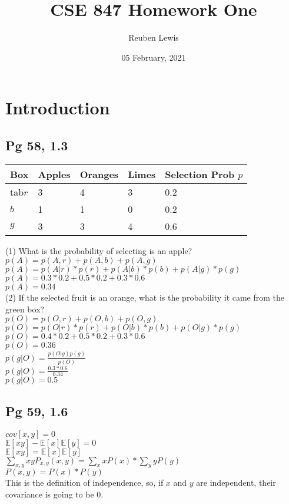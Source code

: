 \documentclass{article}
\title{CSE 847 Homework One}
\author{Reuben Lewis}
\date{05 February, 2021}
\begin{document}
    \maketitle
    \section{Introduction}
    \subsection{Pg 58, 1.3}
        \begin{tabular}{ l | l | l | l | l}
            Box & Apples & Oranges & Limes & Selection Prob $p$ \\
            \hline
            tab$r$ & 3 & 4 & 3 & 0.2\\
            $b$ & 1 & 1 & 0 & 0.2\\
            $g$ & 3 & 3 & 4 & 0.6\\
        \end{tabular}

        (1) What is the probability of selecting is an apple?
            $p(A) = p(A,r) + p(A,b) + p(A,g)$ \\
            $p(A) = p(A|r)*p(r) + p(A|b)*p(b) + p(A|g)*p(g)$ \\
            $p(A) = 0.3*0.2 + 0.5*0.2 + 0.3*0.6$ \\
            $p(A) = 0.34$ \\

        (2) If the selected fruit is an orange, what is the probability 
            it came from the green box? \\
            $p(O) = p(O,r) + p(O,b) + p(O,g)$ \\
            $p(O) = p(O|r)*p(r) + p(O|b)*p(b) + p(O|g)*p(g)$ \\
            $p(O) = 0.4*0.2 + 0.5*0.2 + 0.3*0.6$ \\
            $p(O) = 0.36$ \\
            $p(g|O) = \frac{p(O|g)p(g)}{p(O)}$ \\
            $p(g|O) = \frac{0.3 * 0.6}{0.34}$ \\
            $p(g|O) = 0.5$ 

    \subsection{Pg 59, 1.6}
    $cov[x,y] = 0$\\
    $\mathbb{E} [xy] - \mathbb{E}[x] \mathbb{E}[y] = 0$\\
    $\mathbb{E} [xy] = \mathbb{E}[x] \mathbb{E}[y]$\\
    $\sum_{x,y} xy P_{x,y}(x,y)= \sum_x x P(x) * \sum_y y P(y)$\\
    $P(x,y)= P(x) * P(y)$\\
    This is the definition of independence, so, if $x$ and $y$ are independent,
    their covariance is going to be $0$.
    
\end{document}
